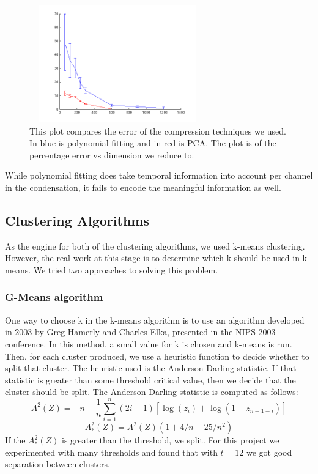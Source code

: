 \documentclass[conference]{IEEEtran}
\begin{document}
\begin{figure}
\centering
\includegraphics[width=3in,height=2in]{../poster/images/error_poly_pca.png}
\caption{This plot compares the error of the compression techniques we
  used. In blue is polynomial fitting and in red is PCA. The plot is of
  the percentage error vs dimension we reduce to.}
\end{figure}

While polynomial fitting does take temporal information into
account per channel in the condensation, it fails to encode the
meaningful information as well.

\subsection{Clustering Algorithms}
As the engine for both of the clustering algorithms, we used k-means
clustering. However, the real work at this stage is to determine which k
should be used in k-means. We tried two approaches to solving this
problem. 

\subsubsection{G-Means algorithm}
One way to choose k in the k-means algorithm is to use an algorithm
developed in 2003 by Greg Hamerly and Charles Elka, presented in the NIPS
2003 conference. In this method, a small value for k is
chosen and k-means is run. Then, for each cluster produced, we use a
heuristic function to decide whether to split that cluster. The heuristic
used is the Anderson-Darling statistic. If that statistic is greater than
some threshold critical value, then we decide that the cluster should be
split. The Anderson-Darling statistic is computed as follows:
$$
A^2(Z) = -n - \frac{1}{n}\sum_{i=1}^n (2i -
1)[\log(z_i)+\log(1-z_{n+1-i})]
$$$$
A^2_*(Z) = A^2(Z)(1 + 4/n - 25/n^2)
$$
If the $A^2_*(Z)$ is greater than the threshold, we split. For this
project we experimented with many thresholds and found that with $t=12$ we
got good separation between clusters.
\end{document}
